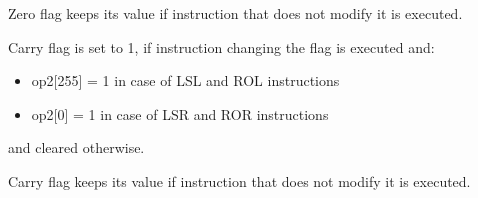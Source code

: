 \documentclass{tropic_design_spec}
\begin{document}
Zero flag keeps its value if instruction that does not modify it is executed.


Carry flag is set to 1, if instruction changing the flag is executed and:
\begin{itemize}
    \item op2[255] = 1 in case of LSL and ROL instructions
    \item op2[0] = 1 in case of LSR and ROR instructions
\end{itemize}
and cleared otherwise.

Carry flag keeps its value if instruction that does not modify it is executed.
\end{document}
